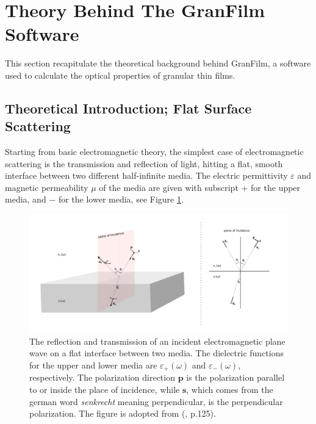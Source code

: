 \section{Theory Behind The GranFilm Software}
This section recapitulate the theoretical background behind GranFilm, a software used to calculate
the optical properties of granular thin films. 
\subsection{Theoretical Introduction; Flat Surface Scattering} \label{sectionFlatScattering}
Starting from basic electromagnetic theory, the simplest case 
of electromagnetic scattering is the transmission and reflection of light, hitting a flat,
smooth interface between two different half-infinite media. 
The electric permittivity $\varepsilon$ and magnetic permeability $\mu$ of the media are given 
with subscript $+$ for the upper media, and $-$ for the lower media, see Figure \ref{fig:flatScattering}. 
\begin{figure}[h!]
  \centering
   \includegraphics[width=1.0\textwidth]{Figures/flatSurfaceScattering.pdf}
   \caption{The reflection and transmission of an incident electromagnetic plane wave on a flat interface
      between two media. The dielectric functions for the upper and lower media are $\varepsilon_{+}(\omega)$
      and  $\varepsilon_{-}(\omega)$, respectively. The polarization direction $\boldsymbol{p}$ is the
      polarization parallel to or inside the place of incidence, while $\boldsymbol{s}$, which comes from the
      german word \textit{senkrecht} meaning perpendicular, is the perpendicular polarization.
      The figure is adopted from (\cite{Lazzari2002}, p.125).
   }
   \label{fig:flatScattering}
\end{figure}
